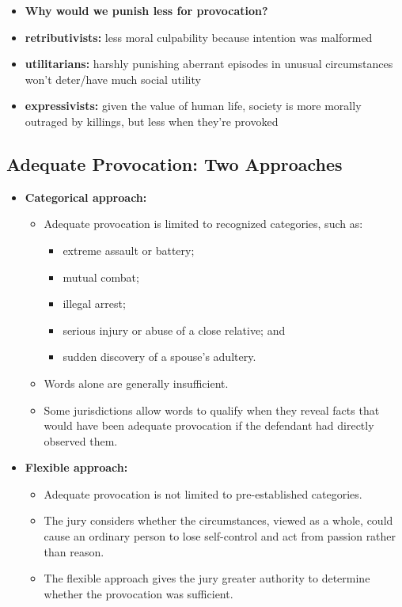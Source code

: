 \documentclass[11pt]{tex/lawoutline}
\begin{document}
{
\begin{itemize}
    \item \textbf{Why would we punish less for provocation?}
    \item \textbf{retributivists:} less moral culpability because intention was malformed
    \item \textbf{utilitarians:} harshly punishing aberrant episodes in unusual circumstances won't deter/have much social utility
    \item \textbf{expressivists:} given the value of human life, society is more morally outraged by killings, but less when they're provoked
\end{itemize}
}


\subsection{Adequate Provocation: Two Approaches}

\begin{itemize}
    \item \textbf{Categorical approach:}
    \begin{itemize}
        \item Adequate provocation is limited to recognized categories, such as:
        \begin{itemize}
            \item extreme assault or battery;
            \item mutual combat;
            \item illegal arrest;
            \item serious injury or abuse of a close relative; and
            \item sudden discovery of a spouse's adultery.
        \end{itemize}
        \item Words alone are generally insufficient.
        \item Some jurisdictions allow words to qualify when they reveal facts that would have been adequate provocation if the defendant had directly observed them.
    \end{itemize}

    \item \textbf{Flexible approach:}
    \begin{itemize}
        \item Adequate provocation is not limited to pre-established categories.
        \item The jury considers whether the circumstances, viewed as a whole, could cause an ordinary person to lose self-control and act from passion rather than reason.
        \item The flexible approach gives the jury greater authority to determine whether the provocation was sufficient.
    \end{itemize}
\end{itemize}
\end{document}
